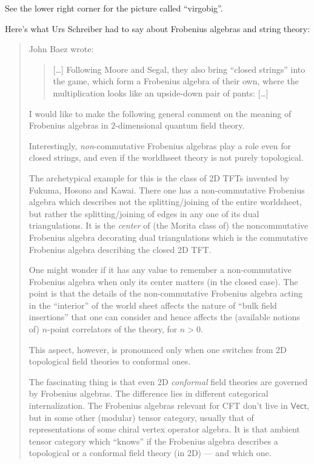 \documentclass{article}
\begin{document}
See the lower right corner for the picture called ``virgobig''.

Here's what Urs Schreiber had to say about Frobenius algebras and string
theory:

\begin{quote}
John Baez wrote:

\begin{quote}
{[}\ldots{]} Following Moore and Segal, they also bring ``closed
strings'' into the game, which form a Frobenius algebra of their own,
where the multiplication looks like an upside-down pair of pants:
{[}\ldots{]}
\end{quote}

I would like to make the following general comment on the meaning of
Frobenius algebras in \(2\)-dimensional quantum field theory.

Interestingly, \emph{non}-commutative Frobenius algebras play a role
even for closed strings, and even if the worldhseet theory is not purely
topological.

The archetypical example for this is the class of 2D TFTs invented by
Fukuma, Hosono and Kawai. There one has a non-commutative Frobenius
algebra which describes not the splitting/joining of the entire
worldsheet, but rather the splitting/joining of edges in any one of its
dual triangulations. It is the \emph{center} of (the Morita class of)
the noncommutative Frobenius algebra decorating dual triangulations
which is the commutative Frobenius algebra describing the closed 2D TFT.

One might wonder if it has any value to remember a non-commutative
Frobenius algebra when only its center matters (in the closed case). The
point is that the details of the non-commutative Frobenius algebra
acting in the ``interior'' of the world sheet affects the nature of
``bulk field insertions'' that one can consider and hence affects the
(available notions of) \(n\)-point correlators of the theory, for
\(n > 0\).

This aspect, however, is pronounced only when one switches from 2D
topological field theories to conformal ones.

The fascinating thing is that even 2D \emph{conformal} field theories
are governed by Frobenius algebras. The difference lies in different
categorical internalization. The Frobenius algebras relevant for CFT
don't live in \(\mathsf{Vect}\), but in some other (modular) tensor
category, usually that of representations of some chiral vertex operator
algebra. It is that ambient tensor category which ``knows'' if the
Frobenius algebra describes a topological or a conformal field theory
(in 2D) --- and which one.


\end{quote}
\end{document}
